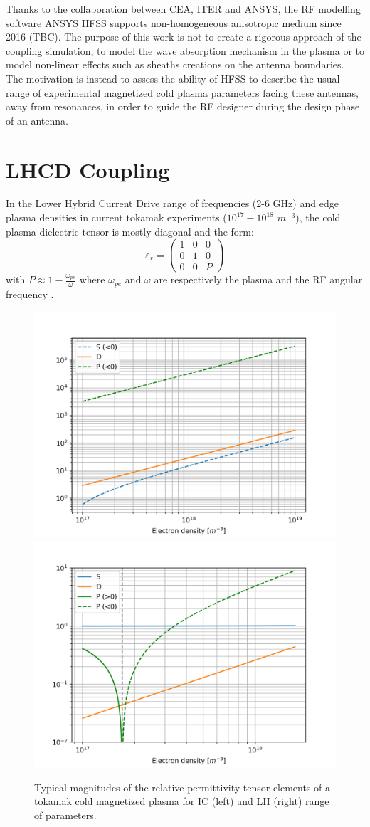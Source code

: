 \documentclass[preprint,3p,twocolumn]{elsarticle}
\begin{document}
Thanks to the collaboration between CEA, ITER and ANSYS, the RF modelling software ANSYS HFSS supports non-homogeneous anisotropic medium since 2016 (TBC). The purpose of this work is not to create a rigorous approach of the coupling simulation, to model the wave absorption mechanism in the plasma or to model non-linear effects such as sheaths creations on the antenna boundaries. The motivation is instead to assess the ability of HFSS to describe the usual range of experimental magnetized cold plasma parameters facing these antennas, away from resonances, in order to guide the RF designer during the design phase of an antenna. 


\section{LHCD Coupling}
In the Lower Hybrid Current Drive range of frequencies (2-6 GHz) and edge plasma densities in current tokamak experiments ($10^{17}-10^{18}$ $m^{-3}$), the cold plasma dielectric tensor is mostly diagonal and the form:
\begin{equation}
\varepsilon_r 
=
\left(
\begin{array}{ccc}
1 & 0 & 0 \\
0 & 1 & 0 \\
0 & 0 & P
\end{array}
\right)
\end{equation}
with $P\approx 1 - \frac{\omega_{pe}}{\omega}$ where $\omega_{pe}$ and $\omega$ are respectively the plasma and the RF angular frequency .  

\begin{figure}
	\centering
	\includegraphics[width=0.48\linewidth]{figures/IC_SDP}
	\includegraphics[width=0.48\linewidth]{figures/LH_SDP}
	\caption{Typical magnitudes of the relative permittivity tensor elements of a tokamak cold magnetized plasma for IC (left) and LH (right) range of parameters.}
	\label{fig:sdp_vs_density}
\end{figure}
\end{document}
